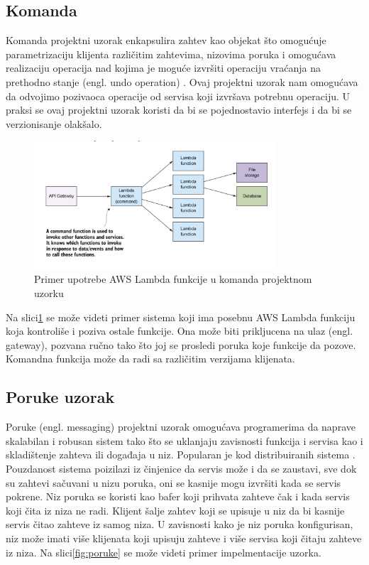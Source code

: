 \documentclass[12pt,oneside]{memoir}
\begin{document}
\subsection{Komanda}
Komanda projektni uzorak enkapsulira zahtev kao objekat što omogućuje parametrizaciju klijenta različitim zahtevima, nizovima poruka i omogućava realizaciju operacija nad kojima je moguće izvršiti operaciju vraćanja na prethodno stanje (engl. undo operation) \cite{cdp}. Ovaj projektni uzorak nam omogućava da odvojimo pozivaoca operacije od servisa koji izvršava potrebnu operaciju. U praksi se ovaj projektni uzorak koristi da bi se pojednostavio interfejs i da bi se verzionisanje olakšalo.

\begin{figure}[!ht]
  \centering
  \includegraphics[width=0.8\textwidth]{Slika 12.png}
  \caption{Primer upotrebe AWS Lambda funkcije u komanda projektnom uzorku}
  \label{fig:komanda}
\end{figure}
 
Na slici\ref{fig:komanda} se može videti primer sistema koji ima posebnu AWS Lambda funkciju koja kontroliše i poziva ostale funkcije. Ona može biti prikljucena na ulaz (engl. gateway), pozvana ručno tako što joj se prosledi poruka koje funkcije da pozove. Komandna funkcija može da radi sa različitim verzijama klijenata.

\subsection{Poruke uzorak} %

Poruke (engl. messaging) projektni uzorak omogućava programerima da naprave skalabilan i robusan sistem tako što se uklanjaju zavisnosti funkcija i servisa kao i skladištenje zahteva ili događaja u niz. Popularan je kod distribuiranih sistema \cite{sa}. Pouzdanost sistema poizilazi iz činjenice da servis može i da se zaustavi, sve dok su zahtevi sačuvani u nizu poruka, oni se kasnije mogu izvršiti kada se servis pokrene. Niz poruka se koristi kao bafer koji prihvata zahteve čak i kada servis koji čita iz niza ne radi. Klijent šalje zahtev koji se upisuje u niz da bi kasnije servis čitao zahteve iz samog niza. U zavisnosti kako je niz poruka konfigurisan, niz može imati više klijenata koji upisuju zahteve i više servisa koji čitaju zahteve iz niza. Na slici\ref{fig:poruke} se može videti primer impelmentacije uzorka.
\end{document}
